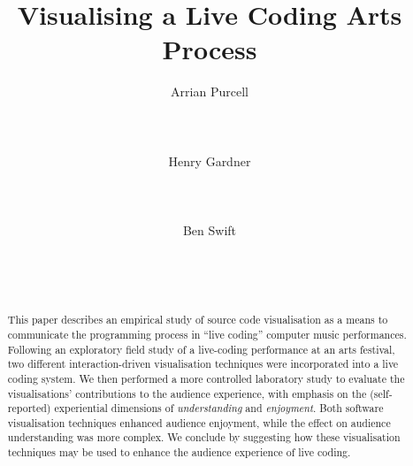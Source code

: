 \documentclass{sig-alternate}
\begin{document}

\title{Visualising a Live Coding Arts Process}

\author{
\alignauthor Arrian Purcell\\
       \\
       \\
       \\
\alignauthor Henry Gardner\\
       \\
       \\
       \\
\alignauthor Ben Swift\\
       \\
       \\
       \\
}

\maketitle
\begin{abstract}
  This paper describes an empirical study of source code visualisation
  as a means to communicate the programming process in ``live coding''
  computer music performances. Following an exploratory field study of
  a live-coding performance at an arts festival, two different
  interaction-driven visualisation techniques were incorporated into a
  live coding system. We then performed a more controlled laboratory
  study to evaluate the visualisations' contributions to the audience
  experience, with emphasis on the (self-reported) experiential
  dimensions of \emph{understanding} and \emph{enjoyment}. Both
  software visualisation techniques enhanced audience enjoyment, while
  the effect on audience understanding was more complex. We conclude
  by suggesting how these visualisation techniques may be used to
  enhance the audience experience of live coding.
\end{abstract}
\end{document}
